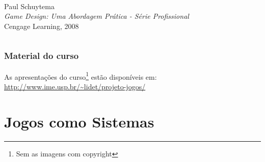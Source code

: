\expandafter\documentclass\expandafter[table, usenames, svgnames, dvipsnames, \classopts]{beamer}
\begin{document}
\begin{frame}
\begin{columns}[c]
			\begin{center}
				\\
				Paul Schuytema\\[0.5em]
				\textit{{\large Game Design: Uma Abordagem Prática - Série Profissional}}\\[0.5em]
				{\small Cengage Learning, 2008}
			\end{center}
			
	\end{columns}		
	
\end{frame}

\begin{frame} 
	\frametitle{\textbf{Material do curso}}
	
	\begin{center}
		{\large
			As apresentações do curso\footnote{Sem as imagens com copyright} estão disponíveis em:\\[1em]
			\url{http://www.ime.usp.br/~lidet/projeto-jogos/}
		}
	\end{center}
	
\end{frame}

\section{Jogos como Sistemas}
\end{document}

